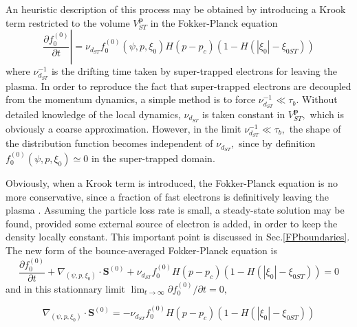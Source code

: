 An heuristic description of this process may be obtained by introducing a
Krook term restricted to the volume $V_{ST}^{\mathbf{p}}$ in the
Fokker-Planck equation
\begin{equation}
\left. \frac{\partial f_{0}^{\left( 0\right) }}{\partial t}\right|
=\nu_{d_{ST}}f_{0}^{\left( 0\right) }\left( \psi,p,\xi_{0}\right) H\left(
p-p_{c}\right) \left( 1-H\left( \left| \xi_{0}\right| -\xi_{0ST}\right)
\right)
\end{equation}
where $\nu_{d_{ST}}^{-1}$ is the drifting time taken by super-trapped
electrons for leaving the plasma. In order to reproduce the fact that
super-trapped electrons are decoupled from the momentum dynamics, a simple
method is to force $\nu_{d_{ST}}^{-1}\ll\tau_{b}.$ Without detailed
knowledge of the local dynamics, $\nu_{d_{ST}}$ is taken constant in $%
V_{ST}^{\mathbf{p}},$ which is obviously a coarse approximation. However, in
the limit $\nu_{d_{ST}}^{-1}\ll\tau_{b},$ the shape of the distribution
function becomes independent of $\nu_{d_{ST}},$ since by definition $%
f_{0}^{\left( 0\right) }\left( \psi,p,\xi_{0}\right) \simeq0$ in the
super-trapped domain.

Obviously, when a Krook term is introduced, the Fokker-Planck equation is no
more conservative, since a fraction of fast electrons is definitively
leaving the plasma . Assuming the particle loss rate is small, a
steady-state solution may be found, provided some external source of
electron is added, in order to keep the density locally constant. This
important point is discussed in Sec.\ref{FPboundaries}. The new form of the
bounce-averaged Fokker-Planck equation is
\begin{equation}
\frac{\partial f_{0}^{\left( 0\right) }}{\partial t}+\nabla_{\left(
\psi,p,\xi_{0}\right) }\cdot\mathbf{S}^{\left( 0\right)
}+\nu_{d_{ST}}f_{0}^{\left( 0\right) }H\left( p-p_{c}\right) \left(
1-H\left( \left| \xi_{0}\right| -\xi_{0ST}\right) \right) =0
\end{equation}
and in this stationnary limit $\lim_{t\rightarrow\infty}\partial
f_{0}^{\left( 0\right) }/\partial t=0,$

\begin{equation}
\nabla_{\left( \psi,p,\xi_{0}\right) }\cdot\mathbf{S}^{\left( 0\right)
}=-\nu_{d_{ST}}f_{0}^{\left( 0\right) }H\left( p-p_{c}\right) \left(
1-H\left( \left| \xi_{0}\right| -\xi_{0ST}\right) \right)
\label{Steadyripple}
\end{equation}

